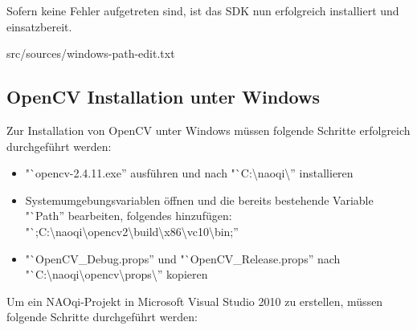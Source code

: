             Sofern keine Fehler aufgetreten sind, ist das SDK nun erfolgreich
            installiert und einsatzbereit.

            
                             {src/sources/windows-path-edit.txt}

        \subsection{OpenCV Installation unter Windows}

            Zur Installation von OpenCV unter Windows müssen folgende Schritte
            erfolgreich durchgeführt werden:

            \begin{itemize}
                \item "`opencv-2.4.11.exe'' ausführen und nach
                    "`C:\textbackslash{}naoqi\textbackslash{}'' installieren

                \item Systemumgebungsvariablen öffnen und die bereits bestehende
                    Variable "`Path'' bearbeiten, folgendes hinzufügen:
                    "`;C:\textbackslash{}naoqi\textbackslash{}opencv2\textbackslash{}build\textbackslash{}x86\textbackslash{}vc10\textbackslash{}bin;''

                \item "`OpenCV\_Debug.props'' und "`OpenCV\_Release.props'' nach
                    "`C:\textbackslash{}naoqi\textbackslash{}opencv\textbackslash{}props\textbackslash{}'' kopieren
            \end{itemize}

            Um ein NAOqi-Projekt in Microsoft Visual Studio 2010 zu erstellen,
            müssen folgende Schritte durchgeführt werden:

